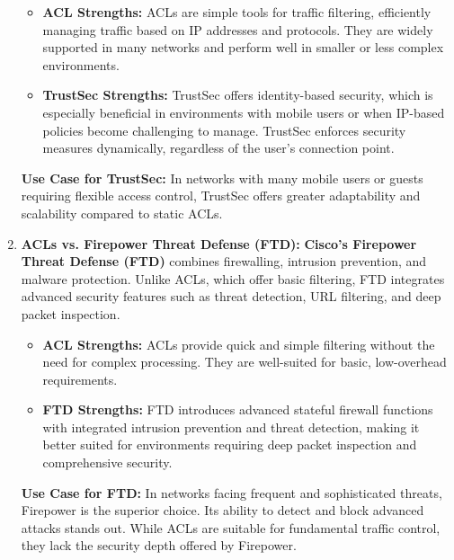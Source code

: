 \documentclass[11pt,a4paper]{article}
\begin{document}
\begin{enumerate}
                \begin{itemize}
                    \item \textbf{ACL Strengths:} ACLs are simple tools for traffic filtering, efficiently managing traffic based on IP addresses and protocols. They are widely supported in many networks and perform well in smaller or less complex environments.

                    \item \textbf{TrustSec Strengths:} TrustSec offers identity-based security, which is especially beneficial in environments with mobile users or when IP-based policies become challenging to manage. TrustSec enforces security measures dynamically, regardless of the user’s connection point.

                \end{itemize}
            
            \textbf{Use Case for TrustSec:} In networks with many mobile users or guests requiring flexible access control, TrustSec offers greater adaptability and scalability compared to static ACLs.

            \item \textbf{ACLs vs. Firepower Threat Defense (FTD):} \textbf{Cisco’s Firepower Threat Defense (FTD)} combines firewalling, intrusion prevention, and malware protection. Unlike ACLs, which offer basic filtering, FTD integrates advanced security features such as threat detection, URL filtering, and deep packet inspection.
                \begin{itemize}
                    \item \textbf{ACL Strengths:} ACLs provide quick and simple filtering without the need for complex processing. They are well-suited for basic, low-overhead requirements.

                    \item \textbf{FTD Strengths:} FTD introduces advanced stateful firewall functions with integrated intrusion prevention and threat detection, making it better suited for environments requiring deep packet inspection and comprehensive security.

                \end{itemize}

            \textbf{Use Case for FTD:} In networks facing frequent and sophisticated threats, Firepower is the superior choice. Its ability to detect and block advanced attacks stands out. While ACLs are suitable for fundamental traffic control, they lack the security depth offered by Firepower.



        \end{enumerate}
\end{document}
